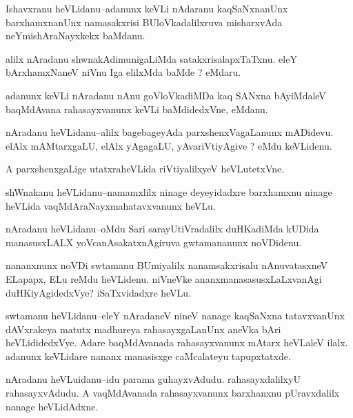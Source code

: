 \documentclass{article}
\begin{document}
\begin{mn}%
Ishavxranu heVLidanu--adanunx keVLi nAdaranu kaqSaNxnanUnx barxhamxnanUnx namasakxrisi 
BUloVkadalilxruva misharxvAda neYmishAraNayxkekx baMdanu.
\end{mn}

\begin{mn}%
alilx nAradanu shwnakAdimunigaLiMda satakxrisalapxTaTxnu. eleY bArxhamxNaneV niVnu Iga 
elilxMda baMde ? eMdaru.
\end{mn}

\begin{mn}%
adanunx keVLi nAradanu nAnu goVloVkadiMDa kaq	SANxna bAyiMdaleV baqMdAvana 
rahasayxvanunx keVLi baMdidedxVne, eMdanu.
\end{mn}

\begin{mn}%
nAradanu heVLidanu--alilx bagebageyAda parxshenxVagaLanunx mADidevu. elAlx mAMtarxgaLU, 
elAlx yAgagaLU, yAvariVtiyAgive ? eMdu keVLidenu.
\end{mn}

\begin{mn}%
A parxshenxgaLige utatxraheVLida riVtiyalilxyeV heVLutetxVne.
\end{mn}

\begin{mn}%
shWnakanu heVLidanu--namamxlilx ninage deyeyidadxre barxhamxnu ninage heVLida 
vaqMdAraNayxmahatavxvanunx heVLu.
\end{mn}

\begin{mn}%
nAradanu heVLidanu--oMdu Sari sarayUtiVradalilx duHKadiMda kUDida manasusxLALX 
yoVcanAsakatxnAgiruva gwtamananunx noVDidenu.
\end{mn}

\begin{mn}%
nananxnunx noVDi swtamanu BUmiyalilx nanamsakxrisalu nAnuvatasxneV ELapapx, ELu reMdu 
heVLidenu. niVneVke ananxmanasasusxLaLxvanAgi duHKiyAgidedxVye? iSaTxvidadxre heVLu. 
\end{mn}

\begin{mn}%
swtamanu heVLidanu--eleY nAradaneV nineV nanage kaqSaNxna tatavxvanUnx dAVxrakeya matutx 
madhureya rahasayxgaLanUnx aneVka bAri heVLididedxVye. Adare baqMdAvanada rahasayxvanunx 
mAtarx heVLaleV ilalx. adanunx keVLidare nananx manasisxge caMcalateyu tapupxtatxde.
\end{mn}

\begin{mn}%
nAradanu heVLuidanu--idu parama guhayxvAdudu. rahasayxdalilxyU rahasayxvAdudu. A 
vaqMdAvanada rahasayxvanunx barxhanxnu pUravxdalilx nanage heVLidAdxne.
\end{mn}
\end{document}
